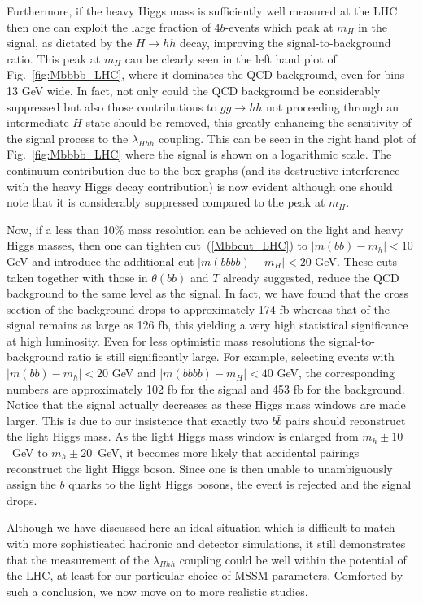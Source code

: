 Furthermore, if the heavy Higgs mass is sufficiently well measured at
the LHC then one can exploit the large fraction \cite{pp} of
$4b$-events which peak at $m_H$ in the signal, as dictated by the
$H\to hh$ decay, improving the signal-to-background ratio.  This peak
at $m_H$ can be clearly seen in the left hand plot of
Fig.~\ref{fig:Mbbbb_LHC}, where it dominates the QCD background, even
for bins 13 GeV wide.  In fact, not only could the QCD background be
considerably suppressed but also those contributions to $gg\to hh$ not
proceeding through an intermediate $H$ state should be removed, this
greatly enhancing the sensitivity of the signal process to the
$\lambda_{Hhh}$ coupling. This can be seen in the right hand plot of
Fig.~\ref{fig:Mbbbb_LHC} where the signal is shown on a logarithmic
scale. The continuum contribution due to the box graphs (and its
destructive interference with the heavy Higgs decay contribution) is
now evident although one should note that it is considerably suppressed
compared to the peak at $m_H$.

Now, if a less than 10\% mass resolution can be achieved on the light
and heavy Higgs masses, then one can tighten cut~(\ref{Mbbcut_LHC}) to
$|m({bb})-m_h|<10$ GeV and introduce the additional cut
$|m({bbbb})-m_H|<20$ GeV. These cuts taken together with those in
$\theta({bb})$ and $T$ already suggested, reduce the QCD background to
the same level as the signal. In fact, we have found that the cross
section of the background drops to approximately 174 fb whereas that
of the signal remains as large as 126 fb, this yielding a very high
statistical significance at high luminosity. Even for less optimistic
mass resolutions the signal-to-background ratio is still significantly
large. For example, selecting events with $|m(bb)-m_h|<20$ GeV and
$|m(bbbb)-m_H|<40$ GeV, the corresponding numbers are approximately
102 fb for the signal and 453 fb for the background. Notice that the
signal actually decreases as these Higgs mass windows are made larger.
This is due to our insistence that exactly two $b \bar b$ pairs should
reconstruct the light Higgs mass. As the light Higgs mass window is
enlarged from $m_h \pm 10$~GeV to $m_h \pm 20$~GeV, it becomes more
likely that accidental pairings reconstruct the light Higgs boson.
Since one is then unable to unambiguously assign the $b$ quarks to the
light Higgs bosons, the event is rejected and the signal drops.

Although we have discussed here an ideal situation which is difficult
to match with more sophisticated hadronic and detector simulations, it
still demonstrates that the measurement of the $\lambda_{Hhh}$
coupling could be well within the potential of the LHC, at least for
our particular choice of MSSM parameters.  Comforted by such a
conclusion, we now move on to more realistic studies.

